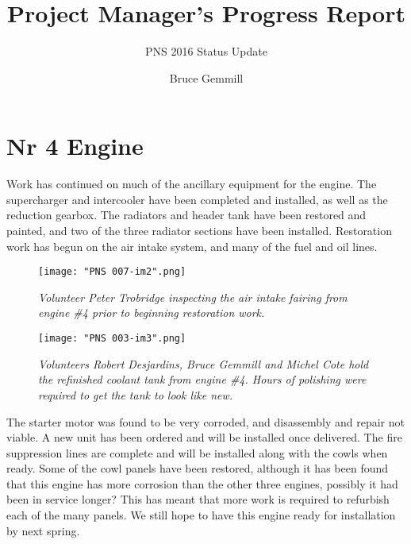 %


\title{Project Manager's Progress Report}
\subtitle{PNS 2016 Status Update}
\author{Bruce Gemmill}

\maketitle

\section{Nr 4 Engine}
\label{sec:engine_4}

Work has continued on much of the ancillary equipment for the engine. The
supercharger and intercooler have been completed and installed, as well as the
reduction gearbox. The radiators and header tank have been restored and painted, and
two of the three radiator sections have been installed. Restoration work has
begun on the air intake system, and many of the fuel and oil lines. 

\begin{figure}[htbp]
   \vspace{2em}
   \centering
   \texttt{[image: "PNS 007-im2".png]}
   \caption*{\small \em Volunteer Peter Trobridge inspecting the air intake fairing from engine \#4 prior to beginning restoration work.}
   \label{fig:engine_no_4_2}
\end{figure}

\begin{figure}[htbp]
   \vspace{2em}
   \centering
   \texttt{[image: "PNS 003-im3".png]}
   \caption*{\small \em Volunteers Robert Desjardins, Bruce Gemmill and Michel Cote hold the refinished coolant tank from engine \#4.  Hours of polishing were required to get the tank to look like new.}
   \label{fig:coolant_tank}
\end{figure}

The starter motor was found to be very corroded, and disassembly and repair not viable. A
new unit has been ordered and will be installed once delivered. The fire
suppression lines are complete and will be installed along with the cowls when
ready. Some of the cowl panels have been restored, although it has been found
that this engine has more corrosion than the other three engines, possibly it
had been in service longer? This has meant that more work is required to
refurbish each of the many panels. We still hope to have this engine ready for
installation by next spring. 

